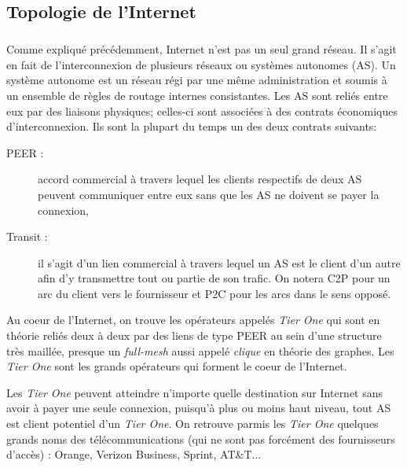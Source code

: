 

%

\subsection{Topologie de l'Internet}
\subparagraph{}
Comme expliqu\'e pr\'ec\'edemment, Internet n'est pas un seul grand r\'eseau. Il s'agit en fait de l'interconnexion de plusieurs r\'eseaux ou syst\`emes autonomes (AS). Un syst\`eme autonome est un r\'eseau r\'egi par une m\^eme administration et soumis \`a un ensemble de r\`egles de routage internes consistantes. Les AS sont reli\'es entre eux par des liaisons physiques; celles-ci sont associ\'ees \`a des contrats \'economiques d'interconnexion. Ils sont la plupart du temps un des deux contrats suivants:
\begin{description}
 \item[PEER : ] accord commercial \`a travers lequel les clients respectifs de deux AS peuvent communiquer entre eux sans que les AS ne doivent se payer la connexion,
 \item[Transit : ] il s'agit d'un lien commercial \`a travers lequel un AS est le client d'un autre afin d'y transmettre tout ou partie de son trafic. On notera C2P pour un arc du client vers le fournisseur et P2C pour les arcs dans le sens oppos\'e.
\end{description}
\par
Au coeur de l'Internet, on trouve les op\'erateurs appel\'es \textit{Tier One} qui sont en th\'eorie reli\'es deux \`a deux par des liens de type PEER au sein d'une structure tr\`es maill\'ee, presque un \textit{full-mesh} aussi appel\'e \textit{clique} en th\'eorie des graphes. Les \textit{Tier One} sont les grands op\'erateurs qui forment le coeur de l'Internet.
\par
 Les \textit{Tier One} peuvent atteindre n'importe quelle destination sur Internet sans avoir \`a payer une seule connexion, puisqu'\`a plus ou moins haut niveau, tout AS est client potentiel d'un \textit{Tier One}. On retrouve parmis les \textit{Tier One} quelques grands noms des télécommunications (qui ne sont pas forcément des fournisseurs d'acc\`es) : Orange, Verizon Business, Sprint, AT\&T...
